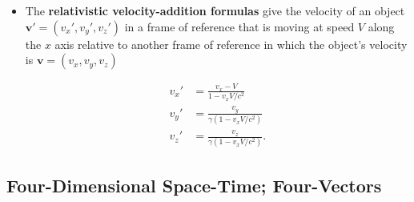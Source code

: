 \documentclass{article}
\renewcommand{\vec}[1]{\boldsymbol{\mathbf{#1}}}
\begin{document}
\begin{itemize}
  \item The \textbf{relativistic velocity-addition formulas} give the velocity of an object $\vec{v}' = (v_x', v_y', v_z')$ in a frame of reference that is moving at speed $V$ along the $x$ axis relative to another frame of reference in which the object's velocity is $\vec{v} = (v_x, v_y, v_z)$

        \begin{align*}
          v_x' & = \frac{v_x - V}{1 - v_x V / c^2}       \\
          v_y' & = \frac{v_y}{\gamma (1 - v_x V / c^2)}  \\
          v_z' & = \frac{v_z}{\gamma (1 - v_x V / c^2)}.
        \end{align*}
\end{itemize}

\subsection{Four-Dimensional Space-Time; Four-Vectors}
\end{document}
